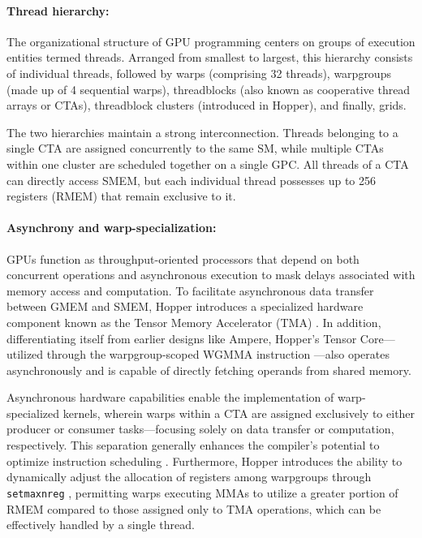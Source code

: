 \paragraph{Thread hierarchy:} The organizational structure of GPU programming centers on groups of execution entities termed threads. Arranged from smallest to largest, this hierarchy consists of individual threads, followed by warps (comprising 32 threads), warpgroups (made up of 4 sequential warps), threadblocks (also known as cooperative thread arrays or CTAs), threadblock clusters (introduced in Hopper), and finally, grids.

The two hierarchies maintain a strong interconnection. Threads belonging to a single CTA are assigned concurrently to the same SM, while multiple CTAs within one cluster are scheduled together on a single GPC. All threads of a CTA can directly access SMEM, but each individual thread possesses up to 256 registers (RMEM) that remain exclusive to it.

\paragraph{Asynchrony and warp-specialization:}

GPUs function as throughput-oriented processors that depend on both concurrent operations and asynchronous execution to mask delays associated with memory access and computation. To facilitate asynchronous data transfer between GMEM and SMEM, Hopper introduces a specialized hardware component known as the Tensor Memory Accelerator (TMA) \cite[\S7.29]{cuda}. In addition, differentiating itself from earlier designs like Ampere, Hopper’s Tensor Core—utilized through the warpgroup-scoped WGMMA instruction \cite[\S9.7.14]{ptx}—also operates asynchronously and is capable of directly fetching operands from shared memory.

Asynchronous hardware capabilities enable the implementation of warp-specialized kernels, wherein warps within a CTA are assigned exclusively to either producer or consumer tasks—focusing solely on data transfer or computation, respectively. This separation generally enhances the compiler’s potential to optimize instruction scheduling \citep{warp-specialization-2011}. Furthermore, Hopper introduces the ability to dynamically adjust the allocation of registers among warpgroups through \verb|setmaxnreg| \cite[\S9.7.17.1]{ptx}, permitting warps executing MMAs to utilize a greater portion of RMEM compared to those assigned only to TMA operations, which can be effectively handled by a single thread.


